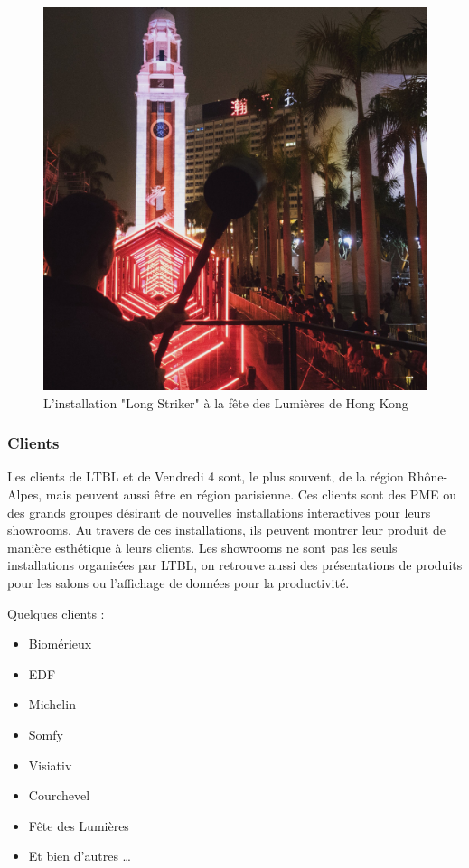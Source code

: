 \documentclass{article}
\begin{document}
\begin{figure}[h]
    \centering
    \includegraphics[scale=0.15]{long-striker.jpg}
    \caption{L'installation "Long Striker" à la fête des Lumières de Hong Kong}
\end{figure}

\clearpage

\subsubsection{Clients}

Les clients de LTBL et de Vendredi 4 sont, le plus souvent, de la région Rhône-Alpes, mais peuvent aussi être en région parisienne.
Ces clients sont des PME ou des grands groupes désirant de nouvelles installations interactives pour leurs showrooms.
Au travers de ces installations, ils peuvent montrer leur produit de manière esthétique à leurs clients.
Les showrooms ne sont pas les seuls installations organisées par LTBL, on retrouve aussi des présentations de produits pour les salons ou l'affichage de données pour la productivité.

\medskip

Quelques clients :

\begin{itemize}
    \item Biomérieux
    \item EDF
    \item Michelin
    \item Somfy
    \item Visiativ
    \item Courchevel
    \item Fête des Lumières
    \item Et bien d'autres \ldots
\end{itemize}
\end{document}
